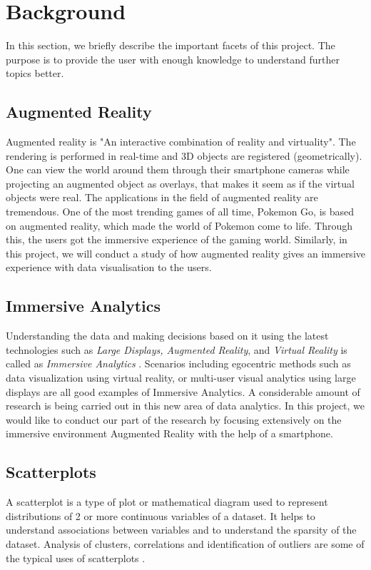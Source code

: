 \documentclass[journal]{vgtc}                %
\begin{document}
\section{Background}

In this section, we briefly describe the important facets of this project. The purpose is to provide the user with enough knowledge to understand further topics better.

\subsection{Augmented Reality}

Augmented reality is "An interactive combination of reality and virtuality"\cite{Billinghurst2014}. The rendering is performed in real-time and 3D objects are registered (geometrically). One can view the world around them through their smartphone cameras while projecting an augmented object as overlays, that makes it seem as if the virtual objects were real. The applications in the field of augmented reality are tremendous. One of the most trending games of all time, Pokemon Go, is based on augmented reality, which made the world of Pokemon come to life. Through this, the users got the immersive experience of the gaming world. Similarly, in this project, we will conduct a study of how augmented reality gives an immersive experience with data visualisation to the users.
 
 
\subsection{Immersive Analytics}
Understanding the data and making decisions based on it using the latest technologies such as \textit{Large Displays, Augmented Reality}, and \textit{Virtual Reality} is called as \textit{Immersive Analytics} \cite{Chandler2015}\cite{bach2016immersive}. Scenarios including egocentric methods such as data visualization using virtual reality, or multi-user visual analytics using large displays are all good examples of Immersive Analytics. A considerable amount of research is being carried out in this new area of data analytics. In this project, we would like to conduct our part of the research by focusing extensively on the immersive environment Augmented Reality with the help of a smartphone.

\subsection{Scatterplots}
A scatterplot is a type of plot or mathematical diagram used to represent distributions of 2 or more continuous variables of a dataset. It helps to understand associations between variables and to understand the sparsity of the dataset. Analysis of clusters, correlations and identification of outliers are some of the typical uses of scatterplots \cite{Tufte1983}.
\end{document}
